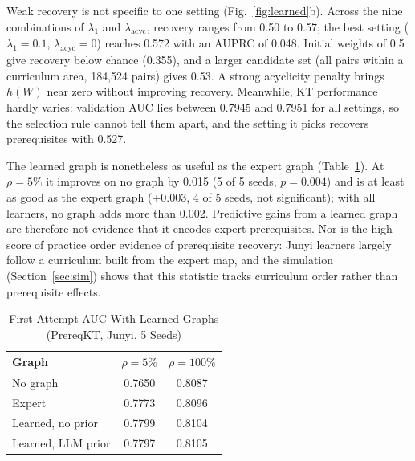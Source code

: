 \documentclass[lettersize,journal]{IEEEtran}
\begin{document}
Weak recovery is not specific to one setting (Fig.~\ref{fig:learned}b). Across the nine combinations of $\lambda_1$ and $\lambda_{\mathrm{acyc}}$, recovery ranges from 0.50 to 0.57; the best setting ($\lambda_1=0.1$, $\lambda_{\mathrm{acyc}}=0$) reaches 0.572 with an AUPRC of 0.048. Initial weights of 0.5 give recovery below chance (0.355), and a larger candidate set (all pairs within a curriculum area, 184{,}524 pairs) gives 0.53. A strong acyclicity penalty brings $h(W)$ near zero without improving recovery. Meanwhile, KT performance hardly varies: validation AUC lies between 0.7945 and 0.7951 for all settings, so the selection rule cannot tell them apart, and the setting it picks recovers prerequisites with 0.527.

The learned graph is nonetheless as useful as the expert graph (Table~\ref{tab:learnedkt}). At $\rho=5\%$ it improves on no graph by 0.015 (5 of 5 seeds, $p=0.004$) and is at least as good as the expert graph (+0.003, 4 of 5 seeds, not significant); with all learners, no graph adds more than 0.002. Predictive gains from a learned graph are therefore not evidence that it encodes expert prerequisites. Nor is the high score of practice order evidence of prerequisite recovery: Junyi learners largely follow a curriculum built from the expert map, and the simulation (Section~\ref{sec:sim}) shows that this statistic tracks curriculum order rather than prerequisite effects.

\begin{table}[t]
\centering
\caption{First-Attempt AUC With Learned Graphs (PrereqKT, Junyi, 5 Seeds)}
\label{tab:learnedkt}
\footnotesize
\begin{tabular}{@{}lcc@{}}
\toprule
Graph & $\rho=5\%$ & $\rho=100\%$ \\
\midrule
No graph & 0.7650 & 0.8087 \\
Expert & 0.7773 & 0.8096 \\
Learned, no prior & 0.7799 & 0.8104 \\
Learned, LLM prior & 0.7797 & 0.8105 \\
\bottomrule
\end{tabular}
\end{table}
\end{document}
